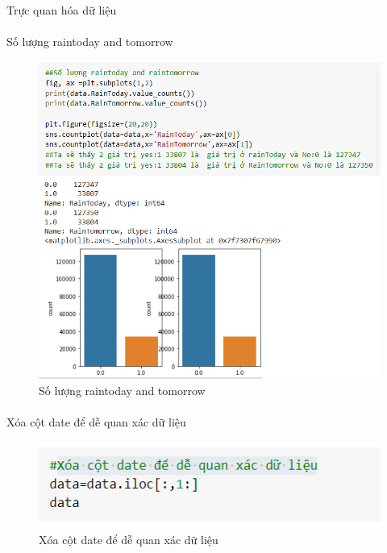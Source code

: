 \documentclass{article}
\begin{document}
\paragraph{}Trực quan hóa dữ liệu
\paragraph{}Số lượng raintoday and tomorrow
\begin{figure}[!h]
	\begin{center}
		\includegraphics[width=\linewidth]{images/code19.png}
		\caption{\fontsize{14}{20}\selectfont Số lượng raintoday and tomorrow}
	\end{center}
\end{figure}
\pagebreak
\paragraph{}Xóa cột date để dễ quan xác dữ liệu
\begin{figure}[!h]
	\begin{center}
		\includegraphics[width=\linewidth]{images/code21.png}
		\caption{\fontsize{14}{20}\selectfont Xóa cột date để dễ quan xác dữ liệu}
	\end{center}
\end{figure}
\end{document}
